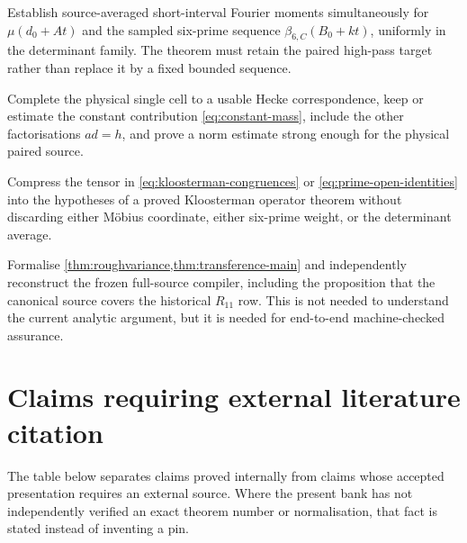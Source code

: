 \begin{problem}\label{prob:localmoments}
Establish source-averaged short-interval Fourier moments simultaneously for
$\mu(d_0+At)$ and the sampled six-prime sequence
$\beta_{6,C}(B_0+kt)$, uniformly in the determinant family.  The theorem must
retain the paired high-pass target rather than replace it by a fixed bounded
sequence.
\end{problem}

\begin{problem}\label{prob:hecke}
Complete the physical single cell to a usable Hecke correspondence, keep or
estimate the constant contribution \cref{eq:constant-mass}, include the other
factorisations $ad=h$, and prove a norm estimate strong enough for the physical
paired source.
\end{problem}

\begin{problem}\label{prob:kloosterman}
Compress the tensor in \cref{eq:kloosterman-congruences} or
\cref{eq:prime-open-identities} into the hypotheses of a proved Kloosterman
operator theorem without discarding either M\"obius coordinate, either
six-prime weight, or the determinant average.
\end{problem}

\begin{problem}\label{prob:formalise}
Formalise \cref{thm:roughvariance,thm:transference-main} and independently
reconstruct the frozen full-source compiler, including the proposition that the
canonical source covers the historical $R_{11}$ row.  This is not needed to
understand the current analytic argument, but it is needed for end-to-end
machine-checked assurance.
\end{problem}

\appendix

\section{Claims requiring external literature citation}\label{app:citations}

The table below separates claims proved internally from claims whose accepted
presentation requires an external source.  Where the present bank has not
independently verified an exact theorem number or normalisation, that fact is
stated instead of inventing a pin.

